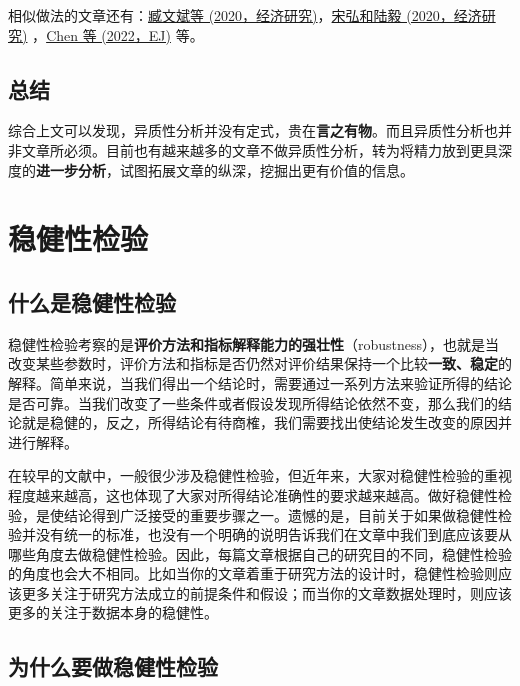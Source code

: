 \documentclass[11pt,a4paper]{ctexart}
\begin{document}
相似做法的文章还有：\href{https://t.cnki.net/kcms/detail?v=3uoqIhG8C44YLTlOAiTRKibYlV5Vjs7iy_Rpms2pqwbFRRUtoUImHXm3eYykmhXufGM0i7N89pqjqWNB48asisQXZ6Ccuo-n&uniplatform=NZKPT}{臧文斌等
(2020，经济研究)}，\href{https://t.cnki.net/kcms/detail?v=3uoqIhG8C44YLTlOAiTRKibYlV5Vjs7i8oRR1PAr7RxjuAJk4dHXoqec8_rQcQP1nk60irasp-iHea8Ljlfw_b-1yZ6x8k-G&uniplatform=NZKPT}{宋弘和陆毅
(2020，经济研究)}
，\href{https://academic.oup.com/ej/article/132/644/1378/6382992}{Chen
等 (2022，EJ)} 等。

\subsection{总结}

综合上文可以发现，异质性分析并没有定式，贵在\textbf{言之有物}。而且异质性分析也并非文章所必须。目前也有越来越多的文章不做异质性分析，转为将精力放到更具深度的\textbf{进一步分析}，试图拓展文章的纵深，挖掘出更有价值的信息。

\section{稳健性检验}

\subsection{什么是稳健性检验}

稳健性检验考察的是\textbf{评价方法和指标解释能力的强壮性}（robustness），也就是当改变某些参数时，评价方法和指标是否仍然对评价结果保持一个比较\textbf{一致、稳定}的解释。简单来说，当我们得出一个结论时，需要通过一系列方法来验证所得的结论是否可靠。当我们改变了一些条件或者假设发现所得结论依然不变，那么我们的结论就是稳健的，反之，所得结论有待商榷，我们需要找出使结论发生改变的原因并进行解释。

在较早的文献中，一般很少涉及稳健性检验，但近年来，大家对稳健性检验的重视程度越来越高，这也体现了大家对所得结论准确性的要求越来越高。做好稳健性检验，是使结论得到广泛接受的重要步骤之一。遗憾的是，目前关于如果做稳健性检验并没有统一的标准，也没有一个明确的说明告诉我们在文章中我们到底应该要从哪些角度去做稳健性检验。因此，每篇文章根据自己的研究目的不同，稳健性检验的角度也会大不相同。比如当你的文章着重于研究方法的设计时，稳健性检验则应该更多关注于研究方法成立的前提条件和假设；而当你的文章数据处理时，则应该更多的关注于数据本身的稳健性。

\subsection{为什么要做稳健性检验}
\end{document}
